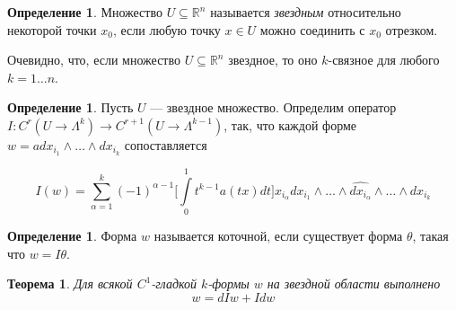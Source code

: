 \documentclass[a5paper]{article}
\newcounter{through}
\theoremstyle{plain}
\newtheorem{theorem}[through]{Теорема}
\theoremstyle{definition}
\newtheorem{definition}[through]{Определение}
\numberwithin{through}{section}
\numberwithin{equation}{section}
\begin{document}

\begin{definition}
	Множество $U \subseteq \mathbb{R}^n$ называется \textit{звездным} относительно некоторой точки $x_0$, если любую точку $x \in U$ можно соединить с $x_0$ отрезком.
\end{definition}

Очевидно, что, если множество $U \subseteq \mathbb{R}^n$ звездное, то оно $k$-связное для любого $k = 1 \ldots n$.

\begin{definition}
	Пусть $U$ --- звездное множество. Определим оператор $I : C^r ( U \to \Lambda^k) \to  C^{r+1} ( U \to \Lambda^{k-1})$, так, что каждой форме $w = adx_{i_1} \wedge \ldots \wedge dx_{i_k}$ сопоставляется
	
	\begin{equation*}
		I(w) = \sum\limits_{\alpha = 1}^{k} (-1)^{\alpha - 1} \bigg[\int\limits_{0}^{1} t^{k-1}a(tx)dt\bigg] x_{i_{\alpha}} dx_{i_1} \wedge \ldots \wedge \widehat{dx_{i_{\alpha}}} \wedge \ldots \wedge dx_{i_k}
	\end{equation*}
\end{definition}

\begin{definition}
	Форма $w$ называется коточной, если существует форма $\theta$, такая что $w = I \theta$.
\end{definition}

\begin{theorem} \label{thwstar}
	Для всякой $C^1$-гладкой $k$-формы $w$ на звездной области выполнено
	\begin{equation*}
		w = d Iw + I dw
	\end{equation*}
\end{theorem}
\end{document}
